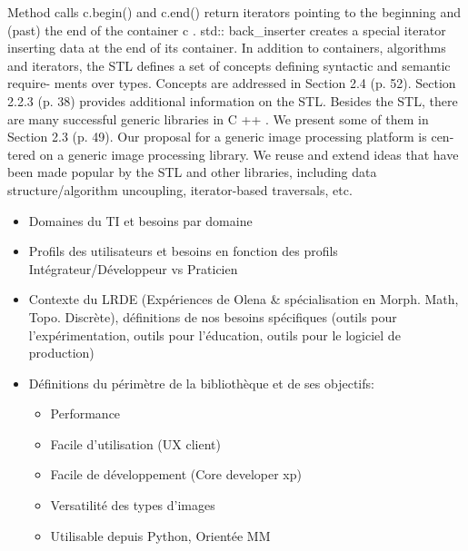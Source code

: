 Method calls c.begin() and c.end() return iterators pointing
to the beginning and (past) the end of the container c . std::
back_inserter creates a special iterator inserting data at the end
of its container.
In addition to containers, algorithms and iterators, the STL
defines a set of concepts defining syntactic and semantic require-
ments over types. Concepts are addressed in Section 2.4 (p. 52).
Section 2.2.3 (p. 38) provides additional information on the STL.
Besides the STL, there are many successful generic libraries in
C ++ . We present some of them in Section 2.3 (p. 49).
Our proposal for a generic image processing platform is cen-
tered on a generic image processing library. We reuse and extend
ideas that have been made popular by the STL and other libraries,
including data structure/algorithm uncoupling, iterator-based
traversals, etc.

\begin{itemize}
  \item Domaines du TI et besoins par domaine
  \item Profils des utilisateurs et besoins en fonction des profils Intégrateur/Développeur vs Praticien
  \item Contexte du LRDE (Expériences de Olena \& spécialisation en Morph. Math, Topo. Discrète), définitions de nos
        besoins spécifiques (outils pour l'expérimentation, outils pour l'éducation, outils pour le logiciel de production)
  \item Définitions du périmètre de la bibliothèque et de ses objectifs:
        \begin{itemize}
          \item Performance
          \item Facile d'utilisation (UX client)
          \item Facile de développement (Core developer xp)
          \item Versatilité des types d'images
          \item Utilisable depuis Python, Orientée MM
        \end{itemize}
\end{itemize}